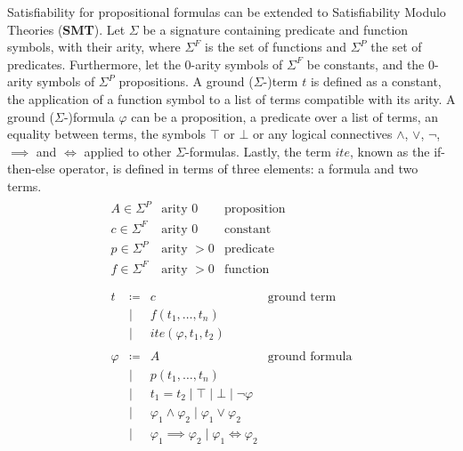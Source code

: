\documentclass[runningheads]{llncs}
\begin{document}
Satisfiability for propositional formulas can be extended to Satisfiability Modulo Theories (\textbf{SMT}).
Let $\Sigma$ be a signature containing predicate and function symbols, with their arity, where $\Sigma^F$ is the set of functions and $\Sigma^P$ the set of predicates.
Furthermore, let the 0-arity symbols of $\Sigma^F$ be constants, and the 0-arity symbols of $\Sigma^P$ propositions.
A ground ($\Sigma$-)term $t$ is defined as a constant, the application of a function symbol to a list of terms compatible with its arity.
A ground ($\Sigma$-)formula $\varphi$ can be a proposition, a predicate over a list of terms, an equality between terms, the symbols $\top$ or $\bot$ or any logical connectives $\land$, $\lor$, $\neg$, $\implies$ and $\iff$ applied to other $\Sigma$-formulas.
Lastly, the term $ite$, known as the if-then-else operator, is defined in terms of three elements: a formula and two terms.
\begin{equation}
    \label{eq:smt-notations}
    \begin{gathered}
        \begin{array}{lll}
            A \in \Sigma^P & \text{arity } 0   & \text{proposition} \\
            c \in \Sigma^F & \text{arity } 0   & \text{constant}    \\
            p \in \Sigma^P & \text{arity } > 0 & \text{predicate}   \\
            f \in \Sigma^F & \text{arity } > 0 & \text{function}    \\
        \end{array}
        \\
        \begin{array}{lrll}
            t       & \coloneqq & c                                                          & \text{ground term}    \\
                    & \mid      & f(t_1, \ldots, t_n)                                                                \\
                    & \mid      & ite(\varphi, t_1, t_2)                                                             \\
            \\
            \varphi & \coloneqq & A                                                          & \text{ground formula} \\
                    & \mid      & p(t_1, \ldots, t_n)                                                                \\
                    & \mid      & t_1 = t_2 \mid \top \mid \bot  \mid \neg\varphi                                    \\
                    & \mid      & \varphi_1 \land \varphi_2 \mid \varphi_1 \lor \varphi_2                            \\
                    & \mid      & \varphi_1 \implies \varphi_2 \mid \varphi_1 \iff \varphi_2                         \\
        \end{array}
    \end{gathered}
\end{equation}
\end{document}
